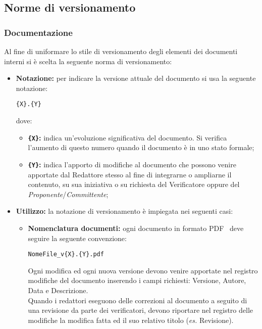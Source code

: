 {{\begin{enumerate}
	\end{enumerate}

}%

	\subsection{Norme di versionamento}{
		\subsubsection{Documentazione}\label{versDocs}{
		Al fine di uniformare lo stile di versionamento degli elementi dei documenti interni si è scelta la seguente norma di versionamento:
		\begin{itemize}
			\item \textbf{Notazione:} per indicare la versione attuale del documento si usa la seguente notazione:
			\begin{center}
				\texttt{\{X\}.\{Y\}}
			\end{center}
			dove:
			\begin{itemize}
				\item \textbf{\texttt{\{X\}}:} indica un'evoluzione significativa del documento. Si verifica l’aumento di questo numero quando il documento è in uno stato formale;
				\item \textbf{\texttt{\{Y\}}:} indica l'apporto di modifiche al documento che possono venire apportate dal Redattore stesso al fine di integrarne o ampliarne il contenuto, su sua iniziativa o su richiesta del Verificatore oppure del \textit{Proponente}/\textit{Committente};
			\end{itemize}			
			\item \textbf{Utilizzo:} la notazione di versionamento è impiegata nei seguenti casi:
			\begin{itemize}
				\item \textbf{Nomenclatura documenti:} ogni documento in formato PDF\g~ deve seguire la seguente convenzione:
				\begin{center}
					\texttt{NomeFile\_v\{X\}.\{Y\}.pdf}
				\end{center}
				
Ogni modifica ed ogni nuova versione devono venire apportate nel registro modifiche del documento inserendo i campi richiesti: Versione, Autore, Data e Descrizione.\\
Quando i redattori eseguono delle correzioni al documento a seguito di una revisione da parte dei verificatori, devono riportare nel registro delle modifiche la modifica  fatta ed il suo relativo titolo (\textit{es.} Revisione).
							

\end{itemize}
\end{itemize}}}}
